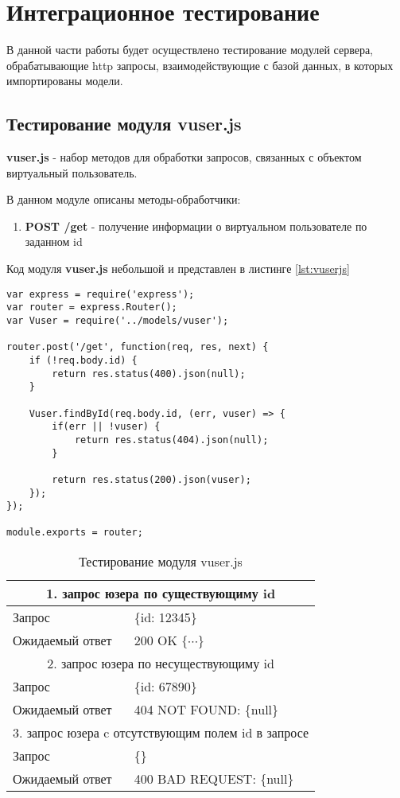 \section{Интеграционное тестирование}

В данной части работы будет осуществлено тестирование модулей сервера, обрабатывающие http запросы, взаимодействующие с базой данных, в которых импортированы модели. 

\subsection{Тестирование модуля vuser.js}

\textbf{vuser.js} - набор методов для обработки запросов, связанных с объектом виртуальный пользователь.

В данном модуле описаны методы-обработчики:
\begin{enumerate}
	\item \textbf{POST /get} - получение информации о виртуальном пользователе по заданном id
\end{enumerate}

Код модуля \textbf{vuser.js} небольшой и представлен в листинге \ref{lst:vuserjs}

\begin{lstlisting}[caption={Код метода обработчика урла /get}, label={lst:vuserjs}]
var express = require('express');
var router = express.Router();
var Vuser = require('../models/vuser');

router.post('/get', function(req, res, next) {
    if (!req.body.id) {
        return res.status(400).json(null);
    }

    Vuser.findById(req.body.id, (err, vuser) => {
        if(err || !vuser) {
            return res.status(404).json(null);
        }

        return res.status(200).json(vuser);
    });
});

module.exports = router;
\end{lstlisting}

\begin{table}[h] 
\caption{\label{tab:vuserjs}Тестирование модуля vuser.js}
\begin{center}
\begin{tabular}{|l|p{10cm}|}
\hline
\multicolumn{2}{|c|}{1. запрос юзера по существующиму id} \\
\hline
Запрос & \{id: 12345\} \\
Ожидаемый ответ & 200 OK $\{\cdots\}$ \\
\hline
\multicolumn{2}{|c|}{2. запрос юзера по несуществующиму id} \\
\hline
Запрос & \{id: 67890\} \\
Ожидаемый ответ & 404 NOT FOUND: \{null\} \\
\hline
\multicolumn{2}{|c|}{3. запрос юзера c отсутствующим полем id в запросе} \\
\hline
Запрос & \{\} \\
Ожидаемый ответ & 400 BAD REQUEST: \{null\} \\
\hline
\end{tabular}
\end{center}
\end{table} 

